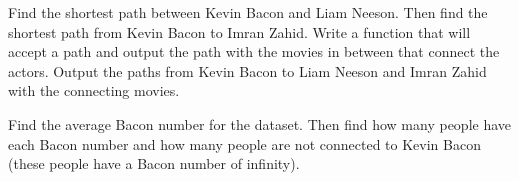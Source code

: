 \begin{problem}
Find the shortest path between Kevin Bacon and Liam Neeson. Then find the shortest path from Kevin Bacon to Imran Zahid. Write a function that will accept a path and output the path with the movies in between that connect the actors. Output the paths from Kevin Bacon to Liam Neeson and Imran Zahid with the connecting movies.
\end{problem}

\begin{problem}
Find the average Bacon number for the dataset. Then find how many people have each Bacon number and how many people are not connected to Kevin Bacon (these people have a Bacon number of infinity).
\end{problem}

